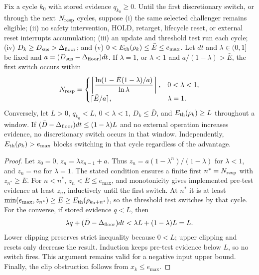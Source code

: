 \begin{proposition} \label{prop:p2live}
Fix a cycle $k_0$ with stored evidence $q_{k_0}\ge0$. Until the first discretionary switch, or through the next $N_{\rm resp}$ cycles, suppose (i) the same selected challenger remains eligible; (ii) no safety intervention, HOLD, retarget, lifecycle reset, or external reset interrupts accumulation; (iii) an update and threshold test run each cycle; (iv) $D_k\ge D_{\rm sus}>\Delta_{\text{floor}}$; and (v) $0<E_{\text{th}}(\rho_k)\le\bar E\le e_{\max}$. Let $dt$ and $\lambda\in(0,1]$ be fixed and $a=(D_{\rm sus}-\Delta_{\text{floor}})dt$. If $\lambda=1$, or $\lambda<1$ and $a/(1-\lambda)>\bar E$, the first switch occurs within
\begin{equation}
N_{\rm resp}=\begin{cases}
\left\lceil\dfrac{\ln(1-\bar E(1-\lambda)/a)}{\ln\lambda}\right\rceil,&0<\lambda<1,\\
\lceil\bar E/a\rceil,&\lambda=1.
\end{cases}
\label{eq:nresp}
\end{equation}
Conversely, let $L>0$, $q_{k_0}<L$, $0<\lambda<1$, $D_k\le\bar D$, and $E_{\text{th}}(\rho_k)\ge L$ throughout a window. If $(\bar D-\Delta_{\text{floor}})dt\le(1-\lambda)L$ and no external operation increases evidence, no discretionary switch occurs in that window. Independently, $E_{\text{th}}(\rho_k)>e_{\max}$ blocks switching in that cycle regardless of the advantage.
\end{proposition}

\begin{proof}
Let $z_0=0$, $z_n=\lambda z_{n-1}+a$. Thus $z_n=a(1-\lambda^n)/(1-\lambda)$ for $\lambda<1$, and $z_n=na$ for $\lambda=1$. The stated condition ensures a finite first $n^*=N_{\rm resp}$ with $z_{n^*}\ge\bar E$. For $n<n^*$, $z_n<\bar E\le e_{\max}$, and monotonicity gives implemented pre-test evidence at least $z_n$, inductively until the first switch. At $n^*$ it is at least $\min(e_{\max},z_{n^*})\ge\bar E\ge E_{\text{th}}(\rho_{k_0+n^*})$, so the threshold test switches by that cycle.
For the converse, if stored evidence $q<L$, then
\[
\lambda q+(\bar D-\Delta_{\text{floor}})dt<\lambda L+(1-\lambda)L=L.
\]
Lower clipping preserves strict inequality because $0<L$; upper clipping and resets only decrease the result. Induction keeps pre-test evidence below $L$, so no switch fires. This argument remains valid for a negative input upper bound. Finally, the clip obstruction follows from $x_k\le e_{\max}$.
\end{proof}

